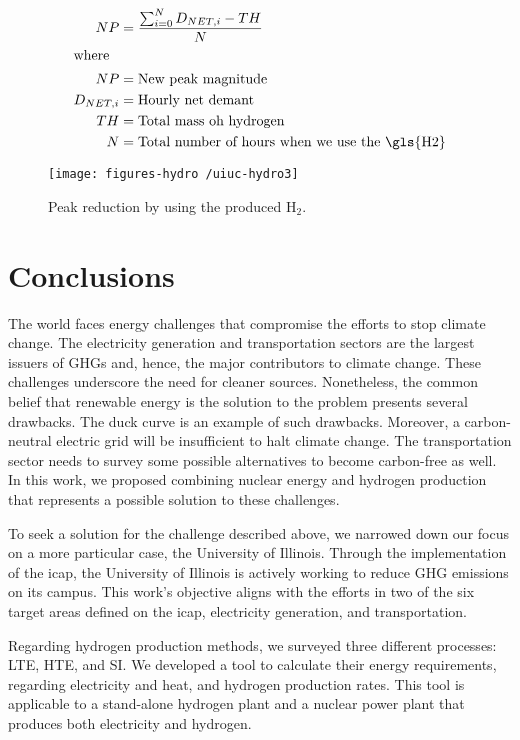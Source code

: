 \documentclass[11pt,letterpaper]{article}
\begin{document}
\begin{align}
	NP &= \frac{\sum_{i=0}^{N} D_{NET, i} - TH}{N} \\
	\label{eq:newpeak}
	\intertext{where}
		NP &= \mbox{New peak magnitude} \\
		D_{NET, i} &= \mbox{Hourly net demant} \\
		TH &= \mbox{Total mass oh hydrogen} \\
		N &= \mbox{Total number of hours when we use the \gls{H2}}
\end{align}

\begin{figure}[htbp!]
    \centering
	\texttt{[image: figures-hydro /uiuc-hydro3]}
	\hfill
	\caption{Peak reduction by using the produced H$_2$.}
	\label{fig:uiuc-duck3}
\end{figure}

\section{Conclusions}

The world faces energy challenges that compromise the efforts to stop climate change.
The electricity generation and transportation sectors are the largest issuers of \glspl{GHG} and, hence, the major contributors to climate change.
These challenges underscore the need for cleaner sources.
Nonetheless, the common belief that renewable energy is the solution to the problem presents several drawbacks.
The duck curve is an example of such drawbacks.
Moreover, a carbon-neutral electric grid will be insufficient to halt climate change.
The transportation sector needs to survey some possible alternatives to become carbon-free as well.
In this work, we proposed combining nuclear energy and hydrogen production that represents a possible solution to these challenges.

To seek a solution for the challenge described above, we narrowed down our focus on a more particular case, the University of Illinois.
Through the implementation of the \gls{icap}, the University of Illinois is actively working to reduce \gls{GHG} emissions on its campus.
This work's objective aligns with the efforts in two of the six target areas defined on the \gls{icap}, electricity generation, and transportation.

Regarding hydrogen production methods, we surveyed three different processes: \gls{LTE}, \gls{HTE}, and \gls{SI}.
We developed a tool to calculate their energy requirements, regarding electricity and heat, and hydrogen production rates.
This tool is applicable to a stand-alone hydrogen plant and a nuclear power plant that produces both electricity and hydrogen.
\end{document}
